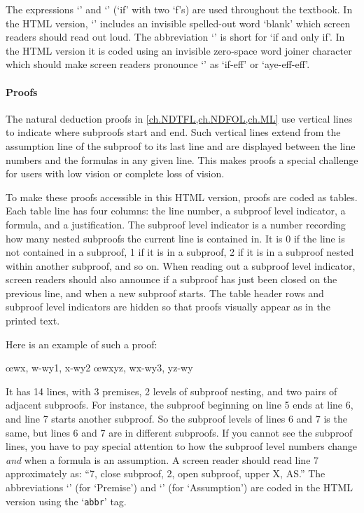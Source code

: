 The expressions `\blank{}' and `\ifeff' (`if' with two `f's) are used
throughout the textbook. In the HTML version, `\blank{}' includes an
invisible spelled-out word `blank' which screen readers should read
out loud. The abbreviation `\ifeff' is short for `if and only if'. In
the HTML version it is coded using an invisible zero-space word joiner
character which should make screen readers pronounce `\ifeff' as
`if-eff' or `aye-eff-eff'.

\paragraph{Proofs} The natural deduction proofs in
\cref{ch.NDTFL,ch.NDFOL,ch.ML} use vertical lines to indicate where
subproofs start and end. Such vertical lines extend from the
assumption line of the subproof to its last line and are displayed
between the line numbers and the formulas in any given line. This
makes proofs a special challenge for users with low vision or complete
loss of vision.

To make these proofs accessible in this HTML version, proofs are coded
as tables. Each table line has four columns: the line number, a
subproof level indicator, a formula, and a justification. The subproof
level indicator is a number recording how many nested subproofs the
current line is contained in. It is 0 if the line is not contained in
a subproof, 1 if it is in a subproof, 2 if it is in a subproof nested
within another subproof, and so on. When reading out a subproof level
indicator, screen readers should also announce if a subproof has just
been closed on the previous line, and when a new subproof starts. The
table header rows and subproof level indicators are hidden so that
proofs visually appear as in the printed text.

Here is an example of such a proof:
\begin{fitchproof}
\PR
{}\PR
{}\PR
\open
	\AS
	\open
		\AS
	\close
	\open
		\AS
	\close
	\oe{wx, w-wy1, x-wy2}
\close
\open
	\AS
\close
{}\oe{wxyz, wx-wy3, yz-wy}
\end{fitchproof}
It has 14 lines, with 3 premises, 2 levels of subproof nesting, and
two pairs of adjacent subproofs. For instance, the subproof beginning
on line 5 ends at line 6, and line 7 starts another subproof. So the
subproof levels of lines 6 and 7 is the same, but lines 6 and 7 are in
different subproofs. If you cannot see the subproof lines, you have to
pay special attention to how the subproof level numbers change
\emph{and} when a formula is an assumption. A screen reader should
read line 7 approximately as: ``7, close subproof, 2, open subproof,
upper X, AS.'' The abbreviations `\PR' (for `Premise') and `\AS' (for
`Assumption') are coded in the HTML version using the `\verb|abbr|'
tag.

